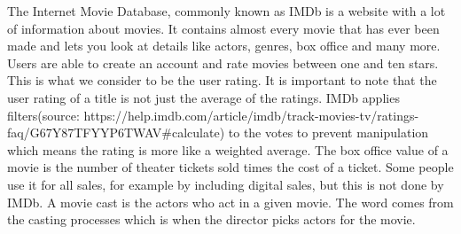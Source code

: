 The Internet Movie Database, commonly known as IMDb is a website with a lot of information about movies. It contains almost every movie that has ever been made and lets you look at details like actors, genres, box office and many more. Users are able to create an account and rate movies between one and ten stars. This is what we consider to be the user rating. It is important to note that the user rating of a title is not just the average of the ratings. IMDb applies filters(source: https://help.imdb.com/article/imdb/track-movies-tv/ratings-faq/G67Y87TFYYP6TWAV\#calculate) to the votes to prevent manipulation which means the rating is more like a weighted average. The box office value of a movie is the number of theater tickets sold times the cost of a ticket. Some people use it for all sales, for example by including digital sales, but this is not done by IMDb. A movie cast is the actors who act in a given movie. The word comes from the casting processes which is when the director picks actors for the movie.